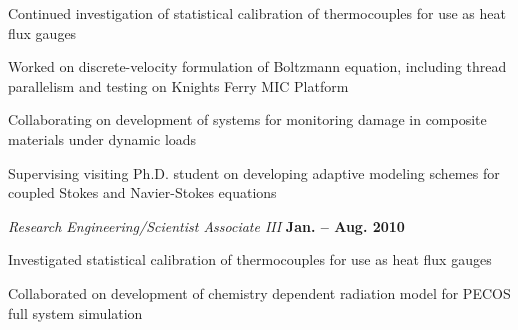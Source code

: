 \documentclass[12pt]{article}
\newenvironment{outerlist}[1][\enskip\textbullet]%
        {\begin{enumerate}[#1]}{\end{enumerate}%
         \vspace{-.6\baselineskip}}
\newenvironment{innerlist}[1][\enskip\textbullet]%
        {\begin{compactenum}[#1]}{\end{compactenum}}
\newcommand{\blankline}{\quad\pagebreak[2]}
\begin{document}
\begin{outerlist}
\begin{innerlist}
\item Continued investigation of statistical calibration of thermocouples for use as heat flux gauges
\item Worked on discrete-velocity formulation of Boltzmann equation, including thread parallelism and testing
on Knights Ferry MIC Platform
%
%
\item Collaborating on development of systems for monitoring damage in composite materials under dynamic loads
%
\item Supervising visiting Ph.D. student on developing adaptive modeling schemes for coupled Stokes and Navier-Stokes
equations
%
\end{innerlist}
\end{outerlist}

\blankline

\begin{outerlist}
\item[] \textit{Research Engineering/Scientist Associate III} \hfill \textbf{Jan. -- Aug. 2010}
\begin{innerlist}
\item Investigated statistical calibration of thermocouples for use as heat flux gauges
\item Collaborated on development of chemistry dependent radiation model for PECOS full system simulation
\end{innerlist}
\end{outerlist}
\end{document}
